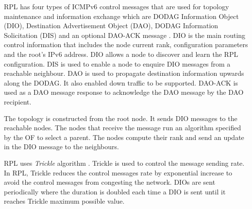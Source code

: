 RPL has four types of ICMPv6 control messages that are used for topology maintenance and information exchange which are DODAG Information Object (DIO), Destination Advertisement Object (DAO), DODAG Information Solicitation (DIS) and an optional DAO-ACK message \cite{winter2012rpl}. DIO is the main routing control information that includes the node current rank, configuration parameters and the root's IPv6 address. DIO allows a node to discover and learn the RPL configuration.
DIS is used to enable a node to enquire DIO messages from a reachable neighbour. DAO is used to propagate destination information upwards along the DODAG. It also enabled down traffic to be supported. DAO-ACK is used as a DAO message response to acknowledge the DAO message by the DAO recipient.  

The topology is constructed from the root node. It sends DIO messages to the reachable nodes. The nodes that receive the message run an algorithm specified by the OF to select a parent. The nodes compute their rank and send an update in the DIO message to the neighbours. 

RPL uses \textit{Trickle} algorithm \cite{trickle}. Trickle is used to control the message sending rate. In RPL, Trickle reduces the control messages rate by exponential increase to avoid the control messages from congesting the network. DIOs are sent periodically where the duration is doubled each time a DIO is sent until it reaches Trickle maximum possible value.





